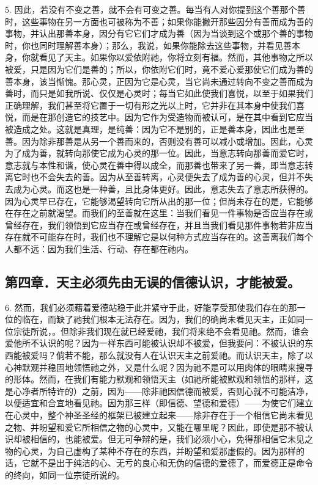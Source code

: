 5. 因此，若没有不变之善，就不会有可变之善。每当有人对你提到这个善那个善时，这些事物在另一方面也可被称为不善；如果你能撇开那些因分有善而成为善的事物，并认出那善本身，因分有它它们才成为善（因为当谈到这个或那个善的事物时，你也同时理解善本身）；那么，我说，如果你能除去这些事物，并看见善本身，你就看见了天主。如果你以爱依附祂，你将立刻有福。然而，其他事物之所以被爱，只是因为它们是善的；所以，你依附它们时，竟不爱心爱那使它们成为善的善本身，该当惭愧。那心灵，正因为它是心灵，当它尚未通过转向不变之善而成为善时，而只是如我所说、仅仅是心灵时；每当它如此使我们喜悦，以至于如果我们正确理解，我们甚至将它置于一切有形之光以上时，它并非在其本身中使我们喜悦，而是在那创造它的技艺中。因为它作为受造物而被认可，是在其中看到它应当被造成之处。这就是真理，是纯善：因为它不是别的，正是善本身，因此也是至善。因为除非那善是从另一个善而来的，否则没有善可以减小或增加。因此，心灵为了成为善，就转向那使它成为心灵的那一位。因此，当意志转向那善而爱它时，意志就与本性和谐，使心灵在善中得以成全，而那善也带来了另一善，即当意志转离它时也不会失去的善。因为从至善转离，心灵便失去了成为善的心灵，但并不失去成为心灵。而这也是一种善，且比身体更好。因此，意志失去了意志所获得的。因为心灵早已存在，它能够渴望转向它所从出的那一位；但尚未存在的是，它能够在存在之前就渴望。而我们的至善就在这里：当我们看见一件事物是否应当存在或曾经存在，我们领悟到它应当存在或曾经存在，并且当我们看见那件事物若非应当存在就不可能存在时，我们也不理解它是以何种方式应当存在的。这善离我们每个人都不远：因为我们生活、行动、存在都在祂内。\par


\subsection{第四章．天主必须先由无误的信德认识，才能被爱。}

6. 然而，我们必须藉着爱德站稳于此并紧守于此，好能享受那使我们存在的那一位的临在，而缺了祂我们根本无法存在。因为，我们的确尚未看见天主，正如同一位宗徒所说，。但除非我们现在就已经爱祂，我们将来绝不会看见祂。然而，谁会爱他所不认识的呢？因为一样东西可能被认识却不被爱，但我要问：不被认识的东西能被爱吗？倘若不能，那么就没有人在认识天主之前爱祂。而认识天主，除了以心神默观并稳固地领悟祂之外，又是什么呢？因为祂不是可以用肉体的眼睛来搜寻的形体。然而，在我们有能力默观和领悟天主（如祂所能被默观和领悟的那样，这是心净者所特许的）之前，因为——除非祂因信德而被爱，否则心就不可能洁净，以便适宜和合宜地看见祂。因为那三样（即信德、望德和爱德）——为使它们建立在心灵中，整个神圣圣经的框架已被建立起来——除非存在于一个相信它尚未看见之物、并盼望和爱它所相信之物的心灵中，又能在哪里呢？因此，即使是那不被认识却被相信的，也能被爱。但无可争辩的是，我们必须小心，免得那相信它未见之物的心灵，为自己虚构了某种不存在的东西，并盼望和爱那虚假的。因为那样的话，它就不是出于纯洁的心、无亏的良心和无伪的信德的爱德了，而爱德正是命令的终向，如同一位宗徒所说的。\par

